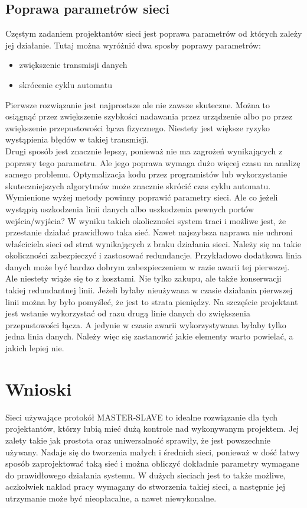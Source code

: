 	\subsection{Poprawa parametrów sieci}
		Częstym zadaniem projektantów sieci jest poprawa parametrów od których zależy jej działanie. Tutaj można wyróżnić dwa sposby poprawy parametrów:
		\begin{itemize}
			\item zwiększenie transmisji danych
			\item skrócenie cyklu automatu
		\end{itemize}
		Pierwsze rozwiązanie jest najprostsze ale nie zawsze skuteczne. Można to osiągnąć przez zwiększenie szybkości nadawania przez urządzenie albo po przez zwiększenie przepustowości łącza fizycznego. Niestety jest większe ryzyko wystąpienia błędów w takiej transmisji.
		\\
		Drugi sposób jest znacznie lepszy, ponieważ nie ma zagrożeń wynikających z poprawy tego parametru. Ale jego poprawa wymaga dużo więcej czasu na analizę samego problemu. Optymalizacja kodu przez programistów lub wykorzystanie skuteczniejszych algorytmów może znacznie skrócić czas cyklu automatu.
		\\
		Wymienione wyżej metody powinny poprawić parametry sieci. Ale co jeżeli wystąpią uszkodzenia linii danych albo uszkodzenia pewnych portów wejścia/wyjścia? W wyniku takich okoliczności system traci i możliwe jest, że przestanie działać prawidłowo taka sieć. Nawet najszybsza naprawa nie uchroni właściciela sieci od strat wynikających z braku działania sieci. Należy się na takie okoliczności zabezpieczyć i zastosować redundancje. Przykładowo dodatkowa linia danych może być bardzo dobrym zabezpieczeniem w razie awarii tej pierwszej. Ale niestety wiąże się to z kosztami. Nie tylko zakupu, ale także konserwacji takiej redundantnej linii. Jeżeli byłaby nieużywana w czasie działania pierwszej linii można by było pomyśleć, że jest to strata pieniędzy. Na szczęście projektant jest wstanie wykorzystać od razu drugą linie danych do zwiększenia przepustowości łącza. A jedynie w czasie awarii wykorzystywana byłaby tylko jedna linia danych. Należy więc się zastanowić jakie elementy warto powielać, a jakich lepiej nie.
		
\section{Wnioski}
		Sieci używające protokół MASTER-SLAVE to idealne rozwiązanie dla tych projektantów, którzy lubią mieć dużą kontrole nad wykonywanym projektem. Jej zalety takie jak prostota oraz uniwersalność sprawiły, że jest powszechnie używany. Nadaje się do tworzenia małych i średnich sieci, ponieważ w dość łatwy sposób zaprojektować taką sieć i można obliczyć dokładnie parametry wymagane do prawidłowego działania systemu. W dużych sieciach jest to także możliwe, aczkolwiek nakład pracy wymagany do stworzenia takiej sieci, a następnie jej utrzymanie może być nieopłacalne, a nawet niewykonalne.
		\\
		
		